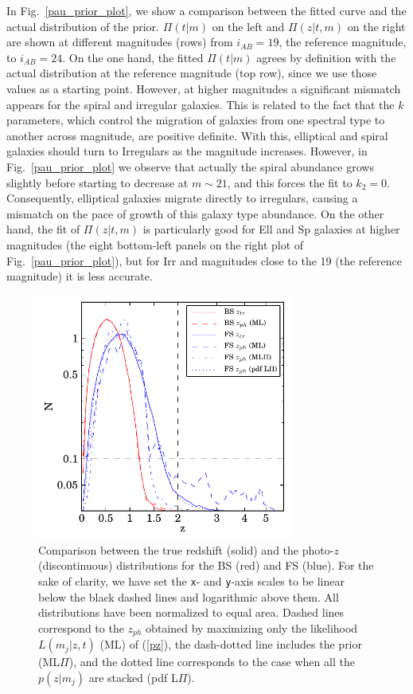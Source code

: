 In Fig.~\ref{pau_prior_plot}, we show a comparison between the fitted curve and the actual distribution of the prior. $\Pi(t|m)$ on the left and $\Pi(z|t,m)$ on the right  are shown at different magnitudes (rows) from $i_{AB}=19$, the reference magnitude, to $i_{AB}=24$. On the one hand, the fitted $\Pi(t|m)$ agrees by definition with the actual distribution at the reference magnitude (top row), since we use those values as a starting point. However, at higher magnitudes a significant mismatch appears for the spiral and irregular galaxies. This is related to the fact that the $k$ parameters, which control the migration of galaxies from one spectral type to another across magnitude, are positive definite. With this, elliptical and spiral galaxies should turn to Irregulars as the magnitude increases. However, in Fig.~\ref{pau_prior_plot} we observe that actually the spiral abundance grows slightly before starting to decrease at $m\sim21$, and this forces the fit to $k_2=0$. Consequently, elliptical galaxies migrate directly to irregulars, causing a mismatch on the pace of growth of this galaxy type abundance. On the other hand, the fit of $\Pi(z|t,m)$ is particularly good for Ell and Sp galaxies at higher magnitudes (the eight bottom-left panels on the right plot of Fig.~\ref{pau_prior_plot}), but for Irr and magnitudes close to the 19 (the reference magnitude) it is less accurate.
\begin{figure}
\centering
\includegraphics[width=84mm]{./plots/Nz_pau.pdf}
\caption{Comparison between the true redshift (solid) and the photo-$z$ (discontinuous) distributions for the BS (red) and FS (blue). For the sake of clarity, we have set the \texttt{x}- and \texttt{y}-axis scales to be linear below the black dashed lines and logarithmic above them. All distributions have been normalized to equal area. Dashed lines correspond to the $z_{ph}$ obtained by maximizing only the likelihood $L(m_j|z,t)$ (ML) of (\ref{pz}), the dash-dotted line includes the prior (ML$\Pi$), and the dotted line corresponds to the case when all the $p(z|m_j)$ are stacked (pdf L$\Pi$).}
\label{z_hist}
\end{figure}
